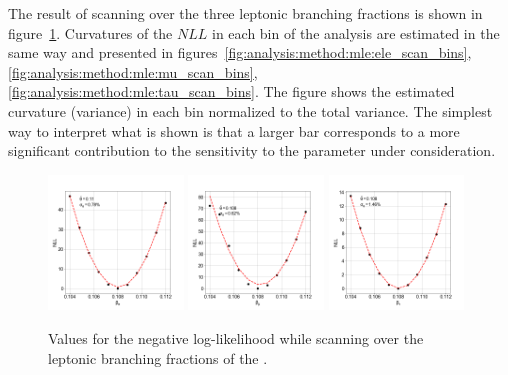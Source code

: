 The result of scanning over the three leptonic branching fractions is shown in figure~\ref{fig:analysis:method:mle:beta_scan_1D}.  Curvatures of the $NLL$ in each bin of the analysis are estimated in the same way and presented in figures~\ref{fig:analysis:method:mle:ele_scan_bins}, \ref{fig:analysis:method:mle:mu_scan_bins}, \ref{fig:analysis:method:mle:tau_scan_bins}. The figure shows the estimated curvature (variance) in each bin normalized to the total variance.  The simplest way to interpret what is shown is that a larger bar corresponds to a more significant contribution to the sensitivity to the parameter under consideration.

\begin{figure}[h]
    \centering
    \includegraphics[width=0.32\textwidth]{chapters/Analysis/sectionStatisticalAnalysis/figures/beta_e}
    \includegraphics[width=0.32\textwidth]{chapters/Analysis/sectionStatisticalAnalysis/figures/beta_mu}
    \includegraphics[width=0.32\textwidth]{chapters/Analysis/sectionStatisticalAnalysis/figures/beta_tau}
    \caption{Values for the negative log-likelihood while scanning over the leptonic branching fractions of the \PW.}
    \label{fig:analysis:method:mle:beta_scan_1D}
\end{figure}

